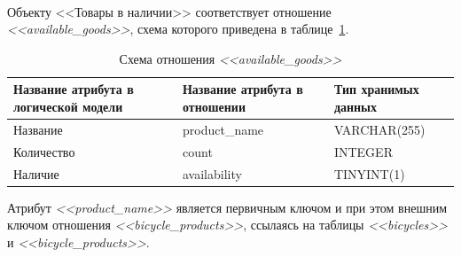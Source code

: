 \paragraph{}
Объекту <<Товары в наличии>> соответствует отношение \textit{<<available\_goods>>}, схема которого приведена в
таблице~\ref{tbl:available_goods_scheme}.
\begin{table}[h!]
  \caption{Схема отношения \textit{<<available\_goods>>}}
  \label{tbl:available_goods_scheme}
  \small{
    \centering
    \begin{tabular}{| p{} | p{} | p{} |}
      \hline
      Название атрибута в \newline логической модели &
      Название атрибута в \newline отношении &
      Тип хранимых данных \\

      \hline
      Название & product\_name & VARCHAR(255) \\

      \hline
      Количество & count & INTEGER \\

      \hline
      Наличие & availability & TINYINT(1) \\

      \hline
    \end{tabular}
  }
\end{table}

Атрибут \textit{<<product\_name>>} является первичным ключом и при этом внешним ключом
отношения \textit{<<bicycle\_products>>}, ссылаясь на таблицы \textit{<<bicycles>>}
и \textit{<<bicycle\_products>>}.

